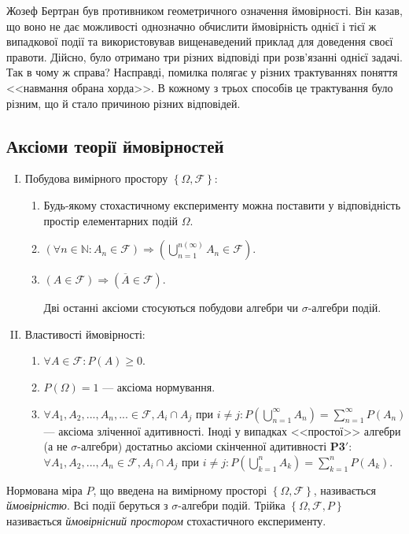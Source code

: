 \begin{example}
    Жозеф Бертран був противником геометричного означення ймовірності.
    Він казав, що воно не дає можливості однозначно обчислити ймовірність
    однієї і тієї ж випадкової події та використовував вищенаведений приклад
    для доведення своєї правоти. Дійсно, було отримано три різних відповіді при
    розв'язанні однієї задачі. Так в чому ж справа? Насправді, помилка полягає
    у різних трактуваннях поняття <<навмання обрана хорда>>.
    В кожному з трьох способів це трактування було різним, що й стало причиною різних відповідей.
\end{example}

\subsection{Аксіоми теорії ймовірностей}
\begin{enumerate}[I.]
    \item Побудова вимірного простору $\left\{ \Omega, \mathcal{F}\right\}$:
    \begin{enumerate}[\bfseries {A}1:]
        \item Будь-якому стохастичному експерименту можна поставити у відповідність
        простір елементарних подій $\Omega$.
        \item $\left(\forall n \in \mathbb{N}: A_n \in \mathcal{F} \right) \Rightarrow \left( \bigcup_{n=1}^{n (\infty)} A_n \in \mathcal{F}\right)$.
        \item $\left( A \in \mathcal{F}\right) \Rightarrow \left( \overline{A} \in \mathcal{F}\right)$.
        
        Дві останні аксіоми стосуються побудови алгебри чи $\sigma$-алгебри подій.
    \end{enumerate}
    \item Властивості ймовірності:
    \begin{enumerate}[\bfseries {P}1:]
        \item $\forall A \in \mathcal{F}: P(A)\geq 0$.
        \item $P(\Omega) = 1$ --- аксіома нормування.
        \item $\forall A_1, A_2, ..., A_n, ... \in \mathcal{F},  A_i \cap A_j \text{ при } i \neq j: P(\bigcup_{n=1}^{\infty} A_n) = \sum_{n=1}^{\infty} P(A_n)$ ---
        аксіома зліченної адитивності.
        Іноді у випадках <<простої>> алгебри (а не $\sigma$-алгебри) достатньо
        аксіоми скінченної адитивності \textbf{P3$'$}: 
        $\forall A_1, A_2, ..., A_n \in \mathcal{F},  A_i \cap A_j \text{ при } i \neq j: P(\bigcup_{k=1}^{n} A_k) = \sum_{k=1}^{n} P(A_k)$.
    \end{enumerate}
\end{enumerate}
\begin{definition}
    Нормована міра $P$, що введена на вимірному просторі $\left\{ \Omega, \mathcal{F}\right\}$,
    називається \emph{ймовірністю}. Всі події беруться з $\sigma$-алгебри подій.
    Трійка $\left\{ \Omega, \mathcal{F}, P\right\}$ називається 
    \emph{ймовірнісний простором} стохастичного експерименту.
\end{definition}

